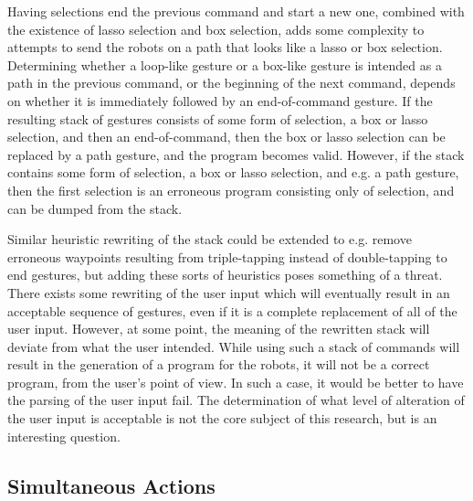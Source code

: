 Having selections end the previous command and start a new one, combined with the existence of lasso selection and box selection, adds some complexity to attempts to send the robots on a path that looks like a lasso or box selection. 
Determining whether a loop-like gesture or a box-like gesture is intended as a path in the previous command, or the beginning of the next command, depends on whether it is immediately followed by an end-of-command gesture. 
If the resulting stack of gestures consists of some form of selection, a box or lasso selection, and then an end-of-command, then the box or lasso selection can be replaced by a path gesture, and the program becomes valid. 
However, if the stack contains some form of selection, a box or lasso selection, and e.g. a path gesture, then the first selection is an erroneous program consisting only of selection, and can be dumped from the stack. 

Similar heuristic rewriting of the stack could be extended to e.g. remove erroneous waypoints resulting from triple-tapping instead of double-tapping to end gestures, but adding these sorts of heuristics poses something of a threat. 
There exists some rewriting of the user input which will eventually result in an acceptable sequence of gestures, even if it is a complete replacement of all of the user input. 
However, at some point, the meaning of the rewritten stack will deviate from what the user intended. 
While using such a stack of commands will result in the generation of a program for the robots, it will not be a correct program, from the user's point of view. 
In such a case, it would be better to have the parsing of the user input fail. 
The determination of what level of alteration of the user input is acceptable is not the core subject of this research, but is an interesting question. 

\subsection{Simultaneous Actions}

